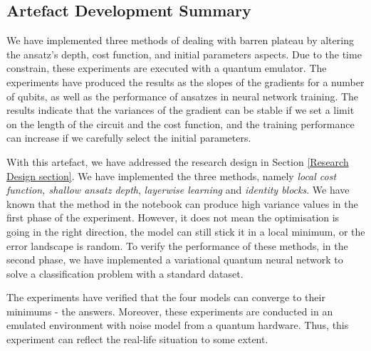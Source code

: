 \subsection{Artefact Development Summary}

We have implemented three methods of dealing with barren plateau by altering the ansatz's depth, cost function, and initial parameters aspects.
Due to the time constrain, these experiments are executed with a quantum emulator.
The experiments have produced the results as the slopes of the gradients for a number of qubits, as well as the performance of ansatzes in neural network training.
The results indicate that the variances of the gradient can be stable if we set a limit on the length of the circuit and the cost function, and the training performance can increase if we carefully select the initial parameters.

With this artefact, we have addressed the research design in Section \ref{Research Design section}.
We have implemented the three methods, namely \textit{local cost function, shallow ansatz depth}, \textit{layerwise learning} and \textit{identity blocks}.
We have known that the method in the notebook can produce high variance values in the first phase of the experiment.
However, it does not mean the optimisation is going in the right direction, the model can still stick it in a local minimum, or the error landscape is random.
To verify the performance of these methods, in the second phase, we have implemented a variational quantum neural network to solve a classification problem with a standard dataset.

The experiments have verified that the four models can converge to their minimums - the answers.
Moreover, these experiments are conducted in an emulated environment with noise model from a quantum hardware.
Thus, this experiment can reflect the real-life situation to some extent.

